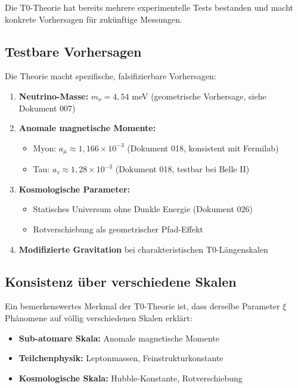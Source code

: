 	Die T0-Theorie hat bereits mehrere experimentelle Tests bestanden und macht konkrete Vorhersagen für zukünftige Messungen.
	
	\subsection{Testbare Vorhersagen}
	
	\begin{keyresult}
		Die Theorie macht spezifische, falsifizierbare Vorhersagen:
		\begin{enumerate}
			\item \textbf{Neutrino-Masse:} $m_\nu = 4{,}54$ meV (geometrische Vorhersage, siehe Dokument 007)
			
			\item \textbf{Anomale magnetische Momente:}
			\begin{itemize}
				\item Myon: $a_\mu \approx 1{,}166 \times 10^{-3}$ (Dokument 018, konsistent mit Fermilab)
				\item Tau: $a_\tau \approx 1{,}28 \times 10^{-3}$ (Dokument 018, testbar bei Belle II)
			\end{itemize}
			
			\item \textbf{Kosmologische Parameter:}
			\begin{itemize}
				\item Statisches Universum ohne Dunkle Energie (Dokument 026)
				\item Rotverschiebung als geometrischer Pfad-Effekt
			\end{itemize}
			
			\item \textbf{Modifizierte Gravitation} bei charakteristischen T0-Längenskalen
		\end{enumerate}
	\end{keyresult}
	
	\subsection{Konsistenz über verschiedene Skalen}
	
	Ein bemerkenswertes Merkmal der T0-Theorie ist, dass derselbe Parameter $\xi$ Phänomene auf völlig verschiedenen Skalen erklärt:
	
	\begin{itemize}
		\item \textbf{Sub-atomare Skala:} Anomale magnetische Momente
		\item \textbf{Teilchenphysik:} Leptonmassen, Feinstrukturkonstante
		\item \textbf{Kosmologische Skala:} Hubble-Konstante, Rotverschiebung
	\end{itemize}
	
